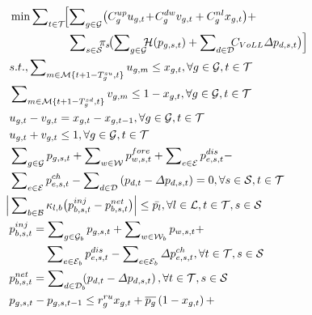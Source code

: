\documentclass[lettersize,journal]{IEEEtran}
\newenvironment{newsubequations}{\small\begin{subequations}}{\end{subequations}}
\begin{document}
\vspace{-0.125in}
\begin{newsubequations}\label{eqn:18}
\begin{align}
		& \min\sum\nolimits_{t\in\mathcal{T}} \!\!\Big[ \!  \sum\nolimits_{g\in\mathcal{G}}\bigl( C_{g}^{{up}}
u_{g,t} \!+\!  C_{g}^{{dw}} v_{g,t} +C_{g}^{nl} x_{g,t}\bigr) + \label{18-a}\\
&\qquad\qquad\quad\,\sum\nolimits_{s\in\mathcal{S}} \!\!\!\pi_{s} \!\bigl(\sum\nolimits_{g\in\mathcal{G}}\!\!\! \mathcal{H}  (p_{g,s,t}) + \sum\nolimits_{d \in\mathcal{D}} \!\!\! C_{{VoLL}}\varDelta p_{d,s,t}\bigr)\Bigr]\notag\\
& s.t., \sum\nolimits_{m\in \mathcal{M}\{t + 1 - T_{g}^{{su}}, t\}} u_{g,m} \leq x_{g,t}, \forall g\in\mathcal{G}, t\in\mathcal{T} \label{18-b}\\
& \sum\nolimits_{m \in \mathcal{M} \{ t +1 -T_{g}^{{sd}}, t\}} v_{g,m} \leq 1 - x_{g,t}, \forall g\in\mathcal{G}, t\in\mathcal{T} \label{18-c}\\
& u_{g,t} - v_{g,t} = x_{g,t} - x_{g,t-1}, \forall g\in\mathcal{G}, t\in\mathcal{T} \label{18-d}\\
& u_{g,t} + v_{g,t} \leq 1, \forall g\in\mathcal{G}, t\in\mathcal{T} \label{18-e}\\
& \sum\nolimits_{g \in \mathcal{G}} p_{g,s,t} + \sum\nolimits_{w\in\mathcal{W}} {p^{fore}_{w,s,t}} +\sum\nolimits_{e\in\mathcal{E}}p_{e,s,t}^{{dis}} - \label{18-f} \\
& \sum\nolimits_{e\in\mathcal{E}}p_{e,s,t}^{{ch}} - \sum\nolimits_{d\in\mathcal{D}}\left(p_{d,t} - \varDelta p_{d,s,t}\right) = 0, \forall s\in\mathcal{S}, t\in\mathcal{T} \notag\\
\Bigl \vert & \sum\nolimits_{b \in \mathcal{B}} \kappa_{l,b}\big( p_{b,s,t}^{inj} - p_{b,s,t}^{net} \big ) \Bigr \vert \leq \bar{p_{l}}, \forall l\in\mathcal{L}, t\in\mathcal{T}, s\in\mathcal{S} \label{18-g} \\
& p_{b,s,t}^{inj} = \sum\nolimits_{g \in\mathcal{G}_b } p_{g,s,t} + \sum\nolimits_{w \in\mathcal{W}_b} p_{w,s,t}  + \label{18-h} \\
& \qquad\quad\, \sum\nolimits_{e \in\mathcal{E}_b} p_{e,s,t}^{{dis}} - \sum\nolimits_{e \in\mathcal{E}_b} \varDelta p_{e,s,t}^{{ch}},\forall t\in\mathcal{T}, s\in\mathcal{S} \notag\\
& p_{b,s,t}^{net}  = \sum\nolimits_{d\in\mathcal{D}_{b}}\!\!\!\left(p_{d,t} - \varDelta p_{d,s,t}\right),\forall t\in\mathcal{T}, s\in\mathcal{S} \label{18-i} \\
& p_{g,s,t} - p_{g,s,t -1} \leq r_{g}^{{ru}} x_{g,t} + \overline{p_{g}}\left(1 - x_{g,t}\right) + \notag\\

\end{align}
\end{newsubequations}
\end{document}
